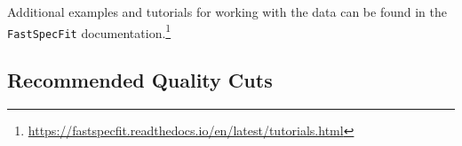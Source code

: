 \documentclass[modern,linenumbers]{aastex701}
\newcommand{\todo}[1]{{\color{red}\textbf{TODO:} #1}}
\newcommand{\fastspecfit}{\texttt{FastSpecFit}}
\newcommand{\fastspec}{\texttt{fastspec}}
\newcommand{\fastphot}{\texttt{fastphot}}
\begin{document}
\noindent Additional examples and tutorials for working with the data
can be found in the \fastspecfit{}
documentation.\footnote{\url{https://fastspecfit.readthedocs.io/en/latest/tutorials.html}}


\subsection{Recommended Quality Cuts}
\label{ssec:cuts}

\end{document}
